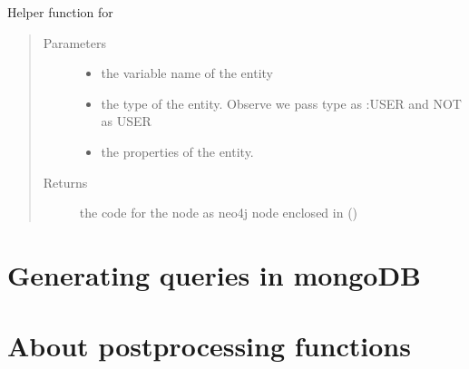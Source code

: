 \documentclass[letterpaper,10pt,english]{sphinxmanual}
\begin{document}
\begin{fulllineitems}
\begin{fulllineitems}
\label{\detokenize{neo4j_query_generation:generate_queries.CreateQuery.generate_node}}
Helper function for {\hyperref[\detokenize{neo4j_query_generation:generate_queries.CreateQuery.conditional_create}]{}}
\begin{quote}\begin{description}
\item[{Parameters}] \leavevmode\begin{itemize}
\item {} 
 \textendash{} the variable name of the entity

\item {} 
 \textendash{} the type of the entity. Observe we pass type as :USER and NOT as USER

\item {} 
 \textendash{} the properties of the entity.

\end{itemize}

\item[{Returns}] \leavevmode
the code for the node as neo4j node enclosed in ()

\end{description}\end{quote}

\end{fulllineitems}


\end{fulllineitems}



\chapter{Generating queries in mongoDB}
\label{\detokenize{mongoDB_query_generation:generating-queries-in-mongodb}}\label{\detokenize{mongoDB_query_generation::doc}}

\chapter{About postprocessing functions}
\label{\detokenize{postprocessing:about-postprocessing-functions}}\label{\detokenize{postprocessing::doc}}
\end{document}
